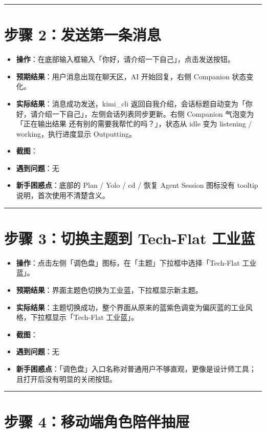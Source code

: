 \documentclass[12pt,a4paper]{ctexart}
\begin{document}
\hrule


\section{步骤 2：发送第一条消息}

\begin{itemize}[leftmargin=2em]
\item \textbf{操作}：在底部输入框输入「你好，请介绍一下自己」，点击发送按钮。
\item \textbf{预期结果}：用户消息出现在聊天区，AI 开始回复，右侧 Companion 状态变化。
\item \textbf{实际结果}：消息成功发送，kimi\_cli 返回自我介绍，会话标题自动变为「你好，请介绍一下自己」，左侧会话列表同步更新。右侧 Companion 气泡变为「正在输出结果 还有别的需要我帮忙的吗？」，状态从 idle 变为 listening / working，执行进度显示 Outputting。
\item \textbf{截图}：
\item \textbf{遇到问题}：无
\item \textbf{新手困惑点}：底部的 Plan / Yolo / cd / 恢复 Agent Session 图标没有 tooltip 说明，首次使用不清楚含义。
\end{itemize}

\hrule


\section{步骤 3：切换主题到 Tech-Flat 工业蓝}

\begin{itemize}[leftmargin=2em]
\item \textbf{操作}：点击左侧「调色盘」图标，在「主题」下拉框中选择「Tech-Flat 工业蓝」。
\item \textbf{预期结果}：界面主题色切换为工业蓝，下拉框显示新主题。
\item \textbf{实际结果}：主题切换成功，整个界面从原来的蓝紫色调变为偏灰蓝的工业风格，下拉框显示「Tech-Flat 工业蓝」。
\item \textbf{截图}：
\item \textbf{遇到问题}：无
\item \textbf{新手困惑点}：「调色盘」入口名称对普通用户不够直观，更像是设计师工具；且打开后没有明显的关闭按钮。
\end{itemize}

\hrule


\section{步骤 4：移动端角色陪伴抽屉}
\end{document}
